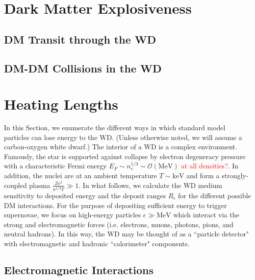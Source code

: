 \documentclass[twocolumn,showpacs,preprintnumbers,amsmath,amssymb,prd]{revtex4}
\newcommand{\OO}{\mathcal{O}}
\begin{document}
\section{Dark Matter Explosiveness}

\subsection{DM Transit through the WD}

\subsection{DM-DM Collisions in the WD}

\section{Heating Lengths}
\label{sec:heatinglengthsummary}

In this Section, we enumerate the different ways in which standard model particles can lose energy to the WD. (Unless otherwise noted, we will assume a carbon-oxygen white dwarf.) The interior of a WD is a complex environment. Famously, the star is supported against collapse by electron degeneracy pressure with a characteristic Fermi energy $E_F \sim n_e^{1/3} \sim \OO(\text{MeV})$ \textcolor{red}{at all densities?}. In addition, the nuclei are at an ambient temperature $T \sim \text{keV}$ and form a strongly-coupled plasma $\frac{Z e^2}{n^{1/3} T} \gg 1$. In what follows, we calculate the WD medium sensitivity to deposited energy and the deposit ranges $R_\epsilon$ for the different possible DM interactions. For the purpose of depositing sufficient energy to trigger supernovae, we focus on high-energy particles $\epsilon \gg \text{MeV}$ which interact via the strong and electromagnetic forces (i.e. electrons, muons, photons, pions, and neutral hadrons). In this way, the WD may be thought of as a ``particle detector" with electromagnetic and hadronic ``calorimeter" components.

\subsection{Electromagnetic Interactions}
\end{document}
